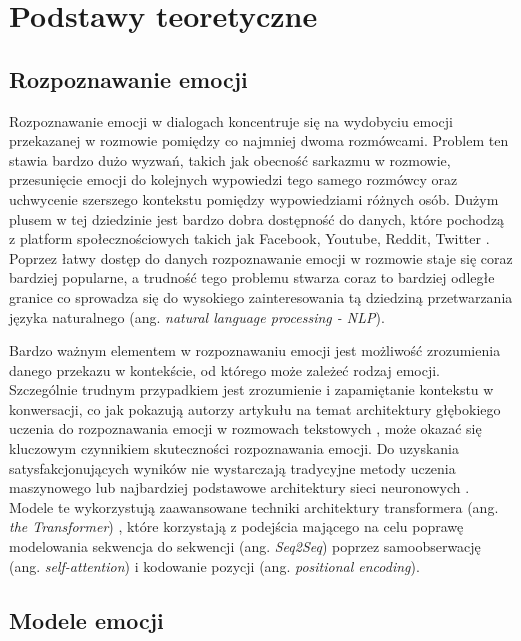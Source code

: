 \chapter{Podstawy teoretyczne}

\section{Rozpoznawanie emocji}

Rozpoznawanie emocji w dialogach koncentruje się na wydobyciu emocji przekazanej w rozmowie pomiędzy co najmniej dwoma rozmówcami. Problem ten stawia bardzo dużo wyzwań, takich jak obecność sarkazmu w rozmowie, przesunięcie emocji do kolejnych wypowiedzi tego samego rozmówcy oraz uchwycenie szerszego kontekstu pomiędzy wypowiedziami różnych osób. Dużym plusem w tej dziedzinie jest bardzo dobra dostępność do danych, które pochodzą z platform społecznościowych takich jak Facebook, Youtube, Reddit, Twitter \cite{poria2019emotion}. Poprzez łatwy dostęp do danych rozpoznawanie emocji w rozmowie staje się coraz bardziej popularne, a trudność tego problemu stwarza coraz to bardziej odległe granice co sprowadza się do wysokiego zainteresowania tą dziedziną przetwarzania języka naturalnego (ang. \textit{natural language processing - NLP}).

Bardzo ważnym elementem w rozpoznawaniu emocji jest możliwość zrozumienia danego przekazu w kontekście, od którego może zależeć rodzaj emocji. Szczególnie trudnym przypadkiem jest zrozumienie i zapamiętanie kontekstu w konwersacji, co jak pokazują autorzy artykułu na temat architektury głębokiego uczenia do rozpoznawania emocji w rozmowach tekstowych \cite{zhong2019knowledgeenriched}, może okazać się kluczowym czynnikiem skuteczności rozpoznawania emocji. Do uzyskania satysfakcjonujących wyników nie wystarczają tradycyjne metody uczenia maszynowego lub najbardziej podstawowe architektury sieci neuronowych \cite{kowsari2019text}. Modele te wykorzystują zaawansowane techniki architektury transformera (ang. \textit{the Transformer}) \cite{vaswani2017attention}, które korzystają z podejścia mającego na celu poprawę modelowania sekwencja do sekwencji (ang. \textit{Seq2Seq}) poprzez samoobserwację (ang. \textit{self-attention}) i kodowanie pozycji (ang. \textit{positional encoding}).

\section{Modele emocji}

